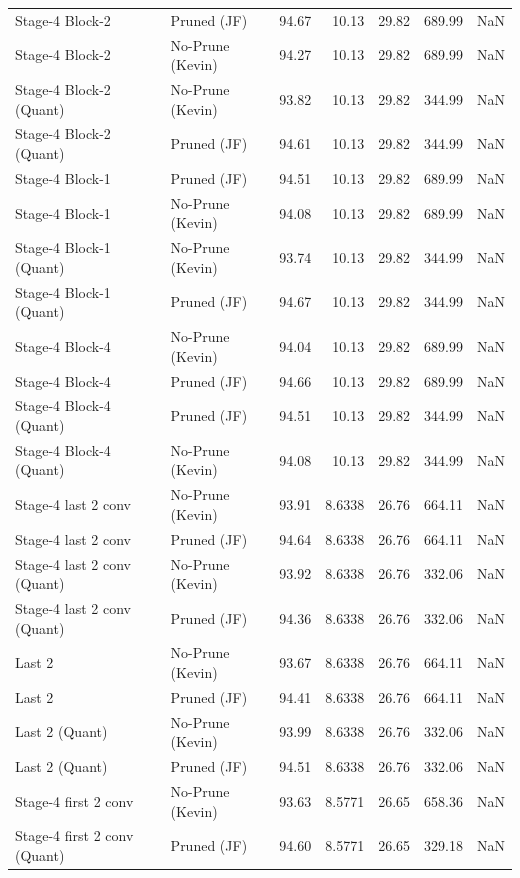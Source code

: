 \begin{table}
\begin{tabular}{llrrrrl}
Stage-4 Block-2 & Pruned (JF) & 94.67 & 10.13 & 29.82 & 689.99 & NaN \\
Stage-4 Block-2 & No-Prune (Kevin) & 94.27 & 10.13 & 29.82 & 689.99 & NaN \\
Stage-4 Block-2
(Quant) & No-Prune (Kevin) & 93.82 & 10.13 & 29.82 & 344.99 & NaN \\
Stage-4 Block-2
(Quant) & Pruned (JF) & 94.61 & 10.13 & 29.82 & 344.99 & NaN \\
Stage-4 Block-1 & Pruned (JF) & 94.51 & 10.13 & 29.82 & 689.99 & NaN \\
Stage-4 Block-1 & No-Prune (Kevin) & 94.08 & 10.13 & 29.82 & 689.99 & NaN \\
Stage-4 Block-1
(Quant) & No-Prune (Kevin) & 93.74 & 10.13 & 29.82 & 344.99 & NaN \\
Stage-4 Block-1
(Quant) & Pruned (JF) & 94.67 & 10.13 & 29.82 & 344.99 & NaN \\
Stage-4 Block-4 & No-Prune (Kevin) & 94.04 & 10.13 & 29.82 & 689.99 & NaN \\
Stage-4 Block-4 & Pruned (JF) & 94.66 & 10.13 & 29.82 & 689.99 & NaN \\
Stage-4 Block-4
(Quant) & Pruned (JF) & 94.51 & 10.13 & 29.82 & 344.99 & NaN \\
Stage-4 Block-4
(Quant) & No-Prune (Kevin) & 94.08 & 10.13 & 29.82 & 344.99 & NaN \\
Stage-4 last 2 conv & No-Prune (Kevin) & 93.91 & 8.6338 & 26.76 & 664.11 & NaN \\
Stage-4 last 2 conv & Pruned (JF) & 94.64 & 8.6338 & 26.76 & 664.11 & NaN \\
Stage-4 last 2 conv
(Quant) & No-Prune (Kevin) & 93.92 & 8.6338 & 26.76 & 332.06 & NaN \\
Stage-4 last 2 conv
(Quant) & Pruned (JF) & 94.36 & 8.6338 & 26.76 & 332.06 & NaN \\
Last 2 & No-Prune (Kevin) & 93.67 & 8.6338 & 26.76 & 664.11 & NaN \\
Last 2 & Pruned (JF) & 94.41 & 8.6338 & 26.76 & 664.11 & NaN \\
Last 2
(Quant) & No-Prune (Kevin) & 93.99 & 8.6338 & 26.76 & 332.06 & NaN \\
Last 2
(Quant) & Pruned (JF) & 94.51 & 8.6338 & 26.76 & 332.06 & NaN \\
Stage-4 first 2 conv & No-Prune (Kevin) & 93.63 & 8.5771 & 26.65 & 658.36 & NaN \\
Stage-4 first 2 conv
(Quant) & Pruned (JF) & 94.60 & 8.5771 & 26.65 & 329.18 & NaN \\

\end{tabular}
\end{table}
